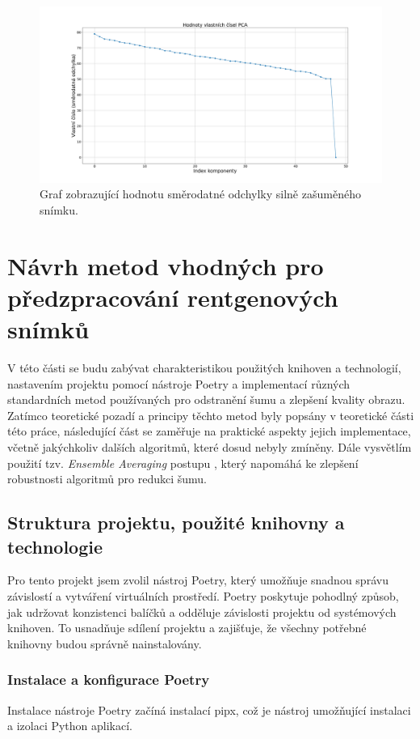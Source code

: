 \documentclass[male,czech,api_ing]{thesis}
\begin{document}
\begin{figure}[h]
    \centering
    \includegraphics[width=\linewidth]{Prilohy/Obrazky/PCA_std_all_three_noise_types.png}
    \caption{Graf zobrazující hodnotu směrodatné odchylky silně zašuměného snímku.}
    \label{fig:PCA_std}
\end{figure}

\section{Návrh metod vhodných pro předzpracování rentgenových snímků}
V této části se budu zabývat charakteristikou použitých knihoven a technologií, nastavením projektu pomocí nástroje Poetry \cite{Poetry} a implementací různých standardních metod používaných pro odstranění šumu a zlepšení kvality obrazu. Zatímco teoretické pozadí a principy těchto metod byly popsány v teoretické části této práce, následující část se zaměřuje na praktické aspekty jejich implementace, včetně jakýchkoliv dalších algoritmů, které dosud nebyly zmíněny. Dále vysvětlím použití tzv. \textit{Ensemble Averaging} postupu \cite{EnsembleAveraging}, který napomáhá ke zlepšení robustnosti algoritmů pro redukci šumu.

\subsection{Struktura projektu, použité knihovny a technologie}
Pro tento projekt jsem zvolil nástroj Poetry, který umožňuje snadnou správu závislostí a vytváření virtuálních prostředí. Poetry poskytuje pohodlný způsob, jak udržovat konzistenci balíčků a odděluje závislosti projektu od systémových knihoven. To usnadňuje sdílení projektu a zajišťuje, že všechny potřebné knihovny budou správně nainstalovány.

\subsubsection{Instalace a konfigurace Poetry}
Instalace nástroje Poetry začíná instalací pipx, což je nástroj umožňující instalaci a izolaci Python aplikací. 
\end{document}
